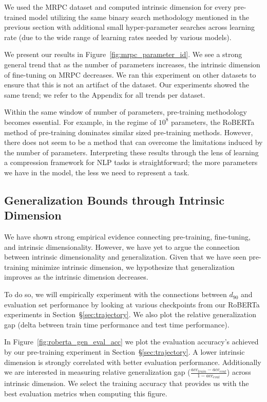 We used the MRPC dataset and computed intrinsic dimension for every pre-trained model utilizing the same binary search methodology mentioned in the previous section with additional small hyper-parameter searches across learning rate (due to the wide range of learning rates needed by various models). 

We present our results in Figure~\ref{fig:mrpc_parameter_id}. We see a strong general trend that as the number of parameters increases, the intrinsic dimension of fine-tuning on MRPC decreases. We ran this experiment on other datasets to ensure that this is not an artifact of the dataset. Our experiments showed the same trend; we refer to the Appendix for all trends per dataset.

Within the same window of number of parameters, pre-training methodology becomes essential. For example, in the regime of $10^8$ parameters, the RoBERTa method of pre-training dominates similar sized pre-training methods. However, there does not seem to be a method that can overcome the limitations induced by the number of parameters. Interpreting these results through the lens of learning a compression framework for NLP tasks is straightforward; the more parameters we have in the model, the less we need to represent a task.

\subsection{Generalization Bounds through Intrinsic Dimension}
\label{sec:generalization}
We have shown strong empirical evidence connecting pre-training, fine-tuning, and intrinsic dimensionality. However, we have yet to argue the connection between intrinsic dimensionality and generalization. Given that we have seen pre-training minimize intrinsic dimension, we hypothesize that generalization improves as the intrinsic dimension decreases.

To do so, we will empirically experiment with the connections between $d_{90}$ and evaluation set performance by looking at various checkpoints from our RoBERTa experiments in Section~\S\ref{sec:trajectory}. We also plot the relative generalization gap (delta between train time performance and test time performance).

In Figure~\ref{fig:roberta_gen_eval_acc} we plot the evaluation accuracy's achieved by our pre-training experiment in Section~\S\ref{sec:trajectory}. A lower intrinsic dimension is strongly correlated with better evaluation performance. Additionally we are interested in measuring relative generalization gap ($\frac{acc_{train}-acc_{eval}}{1-acc_{eval}}$) across intrinsic dimension. We select the training accuracy that provides us with the best evaluation metrics when computing this figure. 

